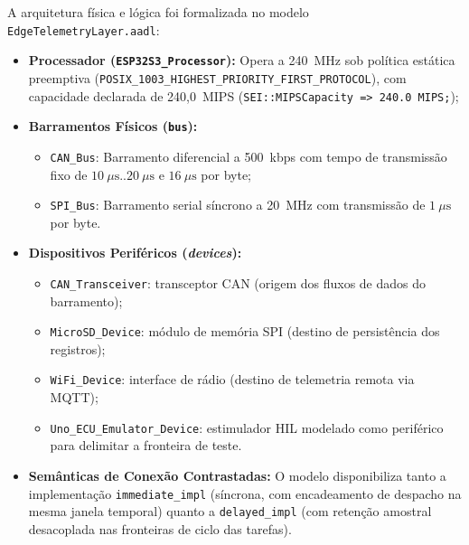 A arquitetura física e lógica foi formalizada no modelo \texttt{EdgeTelemetryLayer.aadl}:
\begin{itemize}
    \item \textbf{Processador (\texttt{ESP32S3\_Processor}):} Opera a 240~MHz sob política estática preemptiva (\texttt{POSIX\_1003\_}\allowbreak\texttt{HIGHEST\_PRIORITY\_}\allowbreak\texttt{FIRST\_PROTOCOL}), com capacidade declarada de 240{,}0~MIPS (\texttt{SEI::MIPSCapacity => 240.0 MIPS;});
    \item \textbf{Barramentos Físicos (\texttt{bus}):}
    \begin{itemize}
        \item \texttt{CAN\_Bus}: Barramento diferencial a 500~kbps com tempo de transmissão fixo de $10\ \mu\text{s} .. 20\ \mu\text{s}$ e $16\ \mu\text{s}$ por byte;
        \item \texttt{SPI\_Bus}: Barramento serial síncrono a 20~MHz com transmissão de $1\ \mu\text{s}$ por byte.
    \end{itemize}
    \item \textbf{Dispositivos Periféricos (\textit{devices}):}
    \begin{itemize}
        \item \texttt{CAN\_Transceiver}: transceptor CAN (origem dos fluxos de dados do barramento);
        \item \texttt{MicroSD\_Device}: módulo de memória SPI (destino de persistência dos registros);
        \item \texttt{WiFi\_Device}: interface de rádio (destino de telemetria remota via MQTT);
        \item \texttt{Uno\_ECU\_Emulator\_Device}: estimulador HIL modelado como periférico para delimitar a fronteira de teste.
    \end{itemize}
    \item \textbf{Semânticas de Conexão Contrastadas:} O modelo disponibiliza tanto a implementação \texttt{immediate\_impl} (síncrona, com encadeamento de despacho na mesma janela temporal) quanto a \texttt{delayed\_impl} (com retenção amostral desacoplada nas fronteiras de ciclo das tarefas).
\end{itemize}


